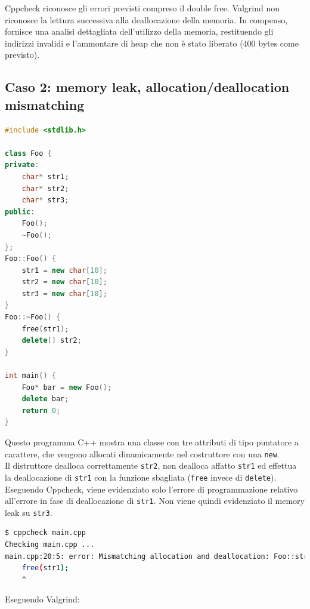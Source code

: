 \documentclass{article}
\begin{document}
Cppcheck riconosce gli errori previsti compreso il double free. Valgrind non riconosce la lettura
successiva alla deallocazione della memoria. In compenso, fornisce una analisi
dettagliata dell'utilizzo della memoria, restituendo gli indirizzi invalidi e
l'ammontare di heap che non è stato liberato (400 bytes come previsto).

\newpage
\subsection{Caso 2: memory leak, allocation/deallocation mismatching}
\label{sec:caso2}

\begin{lstlisting}[language=c++]
#include <stdlib.h>

class Foo {
private:
    char* str1;
    char* str2;
    char* str3;
public:
    Foo();
    ~Foo();
};
Foo::Foo() {
    str1 = new char[10];
    str2 = new char[10];
    str3 = new char[10];
}
Foo::~Foo() {
    free(str1);
    delete[] str2;
}

int main() {
    Foo* bar = new Foo();
    delete bar;
    return 0;
}
\end{lstlisting}

Questo programma C++ mostra una classe con tre attributi di tipo puntatore a
carattere, che vengono allocati dinamicamente nel costruttore con una
\texttt{new}. \\
Il distruttore dealloca correttamente \texttt{str2}, non dealloca affatto
\texttt{str1} ed effettua la deallocazione di \texttt{str1} con la funzione
sbagliata (\texttt{free} invece di \texttt{delete}). \\

Eseguendo Cppcheck, viene evidenziato solo l'errore di programmazione relativo
all'errore in fase di deallocazione di \texttt{str1}. Non viene quindi
evidenziato il memory leak su \texttt{str3}.

\begin{lstlisting}[language=bash]
$ cppcheck main.cpp 
Checking main.cpp ...
main.cpp:20:5: error: Mismatching allocation and deallocation: Foo::str1 [mismatchAllocDealloc]
    free(str1);
    ^
\end{lstlisting}

Eseguendo Valgrind:
\end{document}
